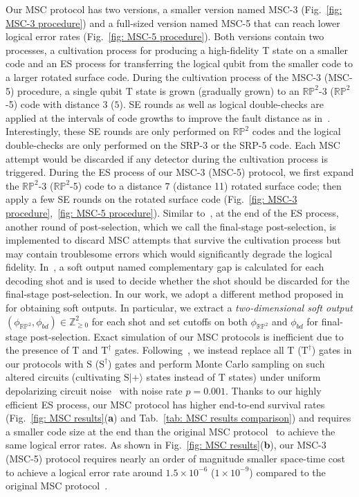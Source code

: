 \documentclass[reprint,aps,twocolumn,superscriptaddress,showpacs,notitlepage,10pt]{revtex4-2}
\theoremstyle{definition}
\begin{document}
Our MSC protocol has two versions, a smaller version named MSC-3 (Fig.~\ref{fig: MSC-3 procedure}) and a full-sized version named MSC-5 that can reach lower logical error rates (Fig.~\ref{fig: MSC-5 procedure}). Both versions contain two processes, a cultivation process for producing a high-fidelity T state on a smaller code and an ES process for transferring the logical qubit from the smaller code to a larger rotated surface code. During the cultivation process of the MSC-3 (MSC-5) procedure, a single qubit $\mathrm{T}$ state is grown (gradually grown) to an $\mathbb{RP}^2$-3 ($\mathbb{RP}^2$-5) code with distance $3$ ($5$). SE rounds as well as logical double-checks are applied at the intervals of code growths to improve the fault distance as in~\cite{gidney_magic_2024}. Interestingly, these SE rounds are only performed on $\mathbb{RP}^2$ codes and the logical double-checks are only performed on the SRP-3 or the SRP-5 code. Each MSC attempt would be discarded if any detector during the cultivation process is triggered. During the ES process of our MSC-3 (MSC-5) protocol, we first expand the $\mathbb{RP}^2$-3 ($\mathbb{RP}^2$-5) code to a distance 7 (distance 11) rotated surface code; then apply a few SE rounds on the rotated surface code (Fig.~\ref{fig: MSC-3 procedure},~\ref{fig: MSC-5 procedure}). Similar to~\cite{gidney_magic_2024,vaknin_magic_2025}, at the end of the ES process, another round of post-selection, which we call the final-stage post-selection, is implemented to discard MSC attempts that survive the cultivation process but may contain troublesome errors which would significantly degrade the logical fidelity. In~\cite{gidney_magic_2024,vaknin_magic_2025}, a soft output named complementary gap is calculated for each decoding shot and is used to decide whether the shot should be discarded for the final-stage post-selection. In our work, we adopt a different method proposed in~\cite{meister_efficient_2024} for obtaining soft outputs. In particular, we extract a \textit{two-dimensional soft output} $(\phi_{\mathbb{RP}^2},\phi_{bd})\in\mathbb{Z}_{\geq 0}^2$ for each shot and set cutoffs on both $\phi_{\mathbb{RP}^2}$ and $\phi_{bd}$ for final-stage post-selection. Exact simulation of our MSC protocols is inefficient due to the presence of $\mathrm{T}$ and $\mathrm{T}^{\dagger}$ gates. Following~\cite{gidney_magic_2024}, we instead replace all $\mathrm{T}$ ($\mathrm{T}^{\dagger}$) gates in our protocols with $\mathrm{S}$ ($\mathrm{S}^{\dagger}$) gates and perform Monte Carlo sampling on such altered circuits (cultivating $\mathrm{S}|+\rangle$ states instead of $\mathrm{T}$ states) under uniform depolarizing circuit noise~\cite{gidney_magic_2024} with noise rate $p=0.001$. Thanks to our highly efficient ES process, our MSC protocol has higher end-to-end survival rates (Fig.~\ref{fig: MSC results}(\textbf{a}) and Tab.~\ref{tab: MSC results comparison}) and requires a smaller code size at the end than the original MSC protocol~\cite{gidney_magic_2024} to achieve the same logical error rates. As shown in Fig.~\ref{fig: MSC results}(\textbf{b}), our MSC-3 (MSC-5) protocol requires nearly an order of magnitude smaller space-time cost to achieve a logical error rate around $1.5\times 10^{-6}$ ($1\times10^{-9}$) compared to the original MSC protocol~\cite{gidney_magic_2024}. 
\end{document}
